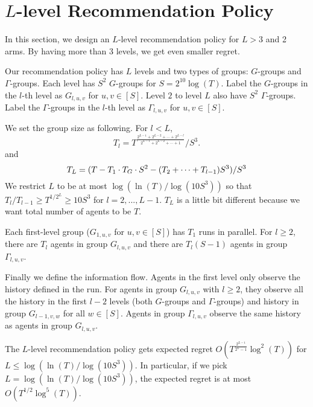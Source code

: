 
\section{$L$-level Recommendation Policy}
In this section, we design an $L$-level recommendation policy for $L > 3$ and 2 arms. By having more than 3 levels, we get even smaller regret. 

Our recommendation policy has $L$ levels and two types of groups: $G$-groups and $\Gamma$-groups. Each level has $S^2$ $G$-groups for $S = 2^{10}\log(T)$. Label the $G$-groups in the $l$-th level as $G_{l,u,v}$ for $u,v \in [S]$. Level $2$ to level $L$ also have $S^2$ $\Gamma$-groups. Label the $\Gamma$-groups in the $l$-th level as $\Gamma_{l,u,v}$ for $u,v \in [S]$. 

We set the group size as following. For $l < L$,
\[
T_l = T^{\frac{2^{L-1} + 2^{L-2} + \cdots + 2^{L-l}}{2^{L-1}+ 2^{L-2} + \cdots + 1}}/S^3.
\]
and 
\[
T_L = (T - T_1 \cdot T_G\cdot S^2 - (T_2 + \cdots + T_{l-1}) S^3) /S^3
\]
We restrict $L$ to be at most $\log(\ln(T)/\log(10S^3))$ so that $T_l / T_{l-1} \geq T^{1/2^L} \geq 10S^3$ for $l = 2,...,L-1$. $T_L$ is a little bit different because we want total number of agents to be $T$. 
 
Each first-level group ($G_{1,u,v}$ for $u,v\in [S]$) has $T_1$ \ALGG runs in parallel. For $l \geq 2$, there are $T_l$ agents in group $G_{l,u,v}$ and there are $T_l (S-1)$ agents in group $\Gamma_{l,u,v}$. 

Finally we define the information flow. Agents in the first level only observe the history defined in the \ALGG run. For agents in group $G_{l,u,v}$ with $l\geq 2$, they observe all the history in the first $l-2$ levels (both $G$-groups and $\Gamma$-groups) and history in group $G_{l-1,v,w}$ for all $w \in [S]$. Agents in group $\Gamma_{l,u,v}$ observe the same history as agents in group $G_{l,u,v}$.

\begin{theorem}
The $L$-level recommendation policy gets expected regret $O\left(T^{\frac{2^{L-1}}{2^L-1}} \log^2(T) \right)$ for $L \leq \log(\ln(T)/\log(10S^3))$. In particular, if we pick $L = \log(\ln(T)/\log(10S^3))$, the expected regret is at most $O(T^{1/2} \log^5(T))$. 
\end{theorem}

